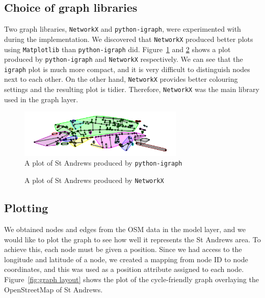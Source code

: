 \documentclass[12pt,a4paper]{report}
\begin{document}
\subsection{Choice of graph libraries}
Two graph libraries, \texttt{NetworkX} and \texttt{python-igraph}, were experimented with during the implementation. We discovered that \texttt{NetworkX} produced better plots using \texttt{Matplotlib} than \texttt{python-igraph} did. Figure~\ref{fig:igraph} and \ref{fig:networkx} shows a plot produced by \texttt{python-igraph} and \texttt{NetworkX} respectively. We can see that the \texttt{igraph} plot is much more compact, and it is very difficult to distinguish nodes next to each other. On the other hand, \texttt{NetworkX} provides better colouring settings and the resulting plot is tidier. Therefore, \texttt{NetworkX} was the main library used in the graph layer.

\begin{figure}[ht]
    \centering
    \includegraphics[width=0.7\textwidth]{diss_images/impl/igraph.png}
    \caption{A plot of St Andrews produced by \texttt{python-igraph}}
    \label{fig:igraph}
\end{figure}

\begin{figure}[ht]
    \centering
    
    \caption{A plot of St Andrews produced by \texttt{NetworkX}}
    \label{fig:networkx}
\end{figure}

\subsection{Plotting}
We obtained nodes and edges from the OSM data in the model layer, and we would like to plot the graph to see how well it represents the St Andrews area. To achieve this, each node must be given a position. Since we had access to the longitude and latitude of a node, we created a mapping from node ID to node coordinates, and this was used as a position attribute assigned to each node. Figure~\ref{fig:graph layout} shows the plot of the cycle-friendly graph overlaying the OpenStreetMap of St Andrews.
\end{document}
